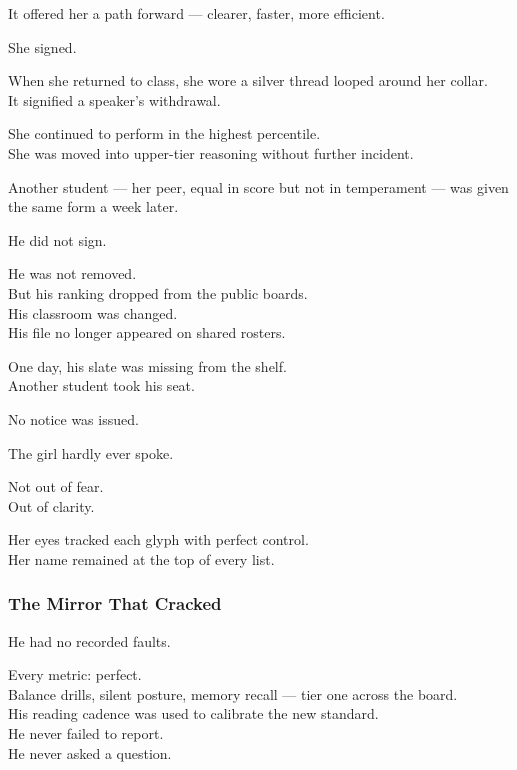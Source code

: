 \documentclass[12pt]{article}
\begin{document}
It offered her a path forward — clearer, faster, more efficient.

She signed.

\vspace{1em}

When she returned to class, she wore a silver thread looped around her collar.\\
It signified a speaker’s withdrawal.

She continued to perform in the highest percentile.\\
She was moved into upper-tier reasoning without further incident.

\vspace{1em}

Another student — her peer, equal in score but not in temperament — was given the same form a week later.

He did not sign.

He was not removed.\\
But his ranking dropped from the public boards.\\
His classroom was changed.\\
His file no longer appeared on shared rosters.

One day, his slate was missing from the shelf.\\
Another student took his seat.

No notice was issued.

\vspace{1em}

The girl hardly ever spoke.

Not out of fear.\\
Out of clarity.

Her eyes tracked each glyph with perfect control.\\
Her name remained at the top of every list.

\dotfill

\subsubsection{The Mirror That Cracked}

He had no recorded faults.

Every metric: perfect.\\
Balance drills, silent posture, memory recall — tier one across the board.\\
His reading cadence was used to calibrate the new standard.\\
He never failed to report.\\
He never asked a question.
\end{document}
